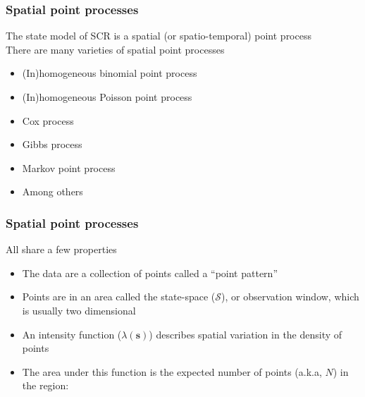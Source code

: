\documentclass[color=usenames,dvipsnames]{beamer}\usepackage[]{graphicx}\usepackage[]{color}
\newcommand{\bs}{{\bm s}}
\begin{document}
\begin{frame}
  \frametitle{Spatial point processes}
  {\centering \large
    The state model of SCR is a spatial (or spatio-temporal) point process \\}
  \vfill
  \pause
  There are many varieties of spatial point processes \\
  \begin{itemize}
    \item (In)homogeneous binomial point process
    \item (In)homogeneous Poisson point process
    \item Cox process
    \item Gibbs process
    \item Markov point process
    \item Among others
  \end{itemize}
\end{frame}





\begin{frame}
  \frametitle{Spatial point processes}
  All share a few properties \\
  \begin{itemize}%
    \item<1-> The data are a collection of points called a ``point pattern''
    \item<2-> Points are in an area called the state-space
      ($\mathcal{S}$), or observation window, which is usually two
      dimensional  
    \item<3-> An intensity function ($\lambda(\bs)$) describes spatial
      variation in the density of points
    \item<4-> The area under this function is the expected number of
      points (a.k.a, $N$) in the region:
  \end{itemize}
  \vfill
  \uncover<5->{
\[
  E(N) = \Lambda = \int_{\mathcal{S}} \lambda(\bs) \;\mathrm{d}\bs
\]
}
\end{frame}
\end{document}
